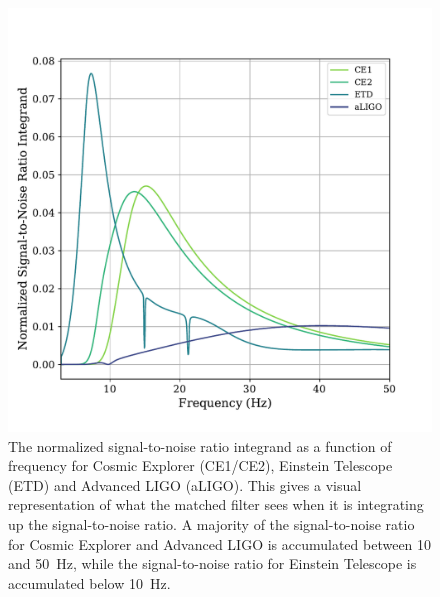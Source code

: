 \begin{figure}
    \includegraphics[width=1.1\columnwidth]{Figures/3G-bns-search-prospects/NormalizedSNR.pdf}
    \caption{The normalized signal-to-noise ratio integrand as a function of frequency for Cosmic Explorer (CE1/CE2), Einstein Telescope (ETD) and Advanced LIGO (aLIGO). This gives a visual representation of what the matched filter sees when it is integrating up the signal-to-noise ratio. A majority of the signal-to-noise ratio for Cosmic Explorer and Advanced LIGO is accumulated between 10 and 50~Hz, while the signal-to-noise ratio for Einstein Telescope is accumulated below 10~Hz.}
\label{Fig:comp-cost-SNRfrac}
\end{figure}

